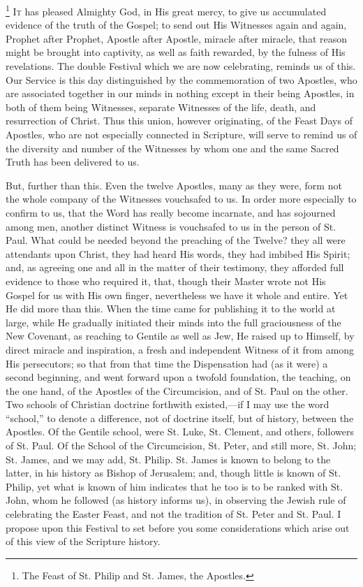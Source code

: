 \footnote{The Feast of St. Philip and St. James, the Apostles.} I\textsc{t} has pleased Almighty
God, in His great mercy, to give us accumulated evidence of the truth of
the Gospel; to send out His Witnesses again and again, Prophet after
Prophet, Apostle after Apostle, miracle after miracle, that reason might
be brought into captivity, as well as faith rewarded, by the fulness of
His revelations. The double Festival which we are now celebrating,
reminds us of this. Our Service is this day distinguished by the
commemoration of two Apostles, who are associated together in our minds
in nothing except in their being Apostles, in both of them being
Witnesses, separate Witnesses of the life, death, and resurrection of
Christ. Thus this union, however originating, of the Feast Days of
Apostles, who are not especially connected in Scripture, will serve to
remind us of the diversity and number of the Witnesses by whom one and
the same Sacred Truth has been delivered to us.

But, further than this. Even the twelve Apostles, many as they were,
form not the whole company of the Witnesses vouchsafed to us. In order
more especially to confirm to us, that the Word has really become
incarnate, and has sojourned among men, another distinct Witness is
vouchsafed to us in the person of St. Paul. What could be needed beyond
the preaching of the Twelve? they all were attendants upon Christ, they
had heard His words, they had imbibed His Spirit; and, as agreeing one
and all in the matter of their testimony, they afforded full evidence to
those who required it, that, though their Master wrote not His Gospel
for us with His own finger, nevertheless we have it whole and entire.
Yet He did more than this. When the time came for publishing it to the
world at large, while He gradually initiated their minds into the full
graciousness of the New Covenant, as reaching to Gentile as well as Jew,
He raised up to Himself, by direct miracle and inspiration, a fresh and
independent Witness of it from among His persecutors; so that from that
time the Dispensation had (as it were) a second beginning, and went
forward upon a twofold foundation, the teaching, on the one hand, of the
Apostles of the Circumcision, and of St. Paul on the other. Two schools
of Christian doctrine forthwith existed,—if I may use the word
``school,'' to denote a difference, not of doctrine itself, but
of history, between the Apostles. Of the Gentile school, were St. Luke,
St. Clement, and others, followers of St. Paul. Of the School of the
Circumcision, St. Peter, and still more, St. John; St. James, and we may
add, St. Philip. St. James is known to belong to the latter, in his
history as Bishop of Jerusalem; and, though little is known of St.
Philip, yet what is known of him indicates that he too is to be ranked
with St. John, whom he followed (as history informs us), in observing
the Jewish rule of celebrating the Easter Feast, and not the tradition
of St. Peter and St. Paul. I propose upon this Festival to set before
you some considerations which arise out of this view of the Scripture
history.

